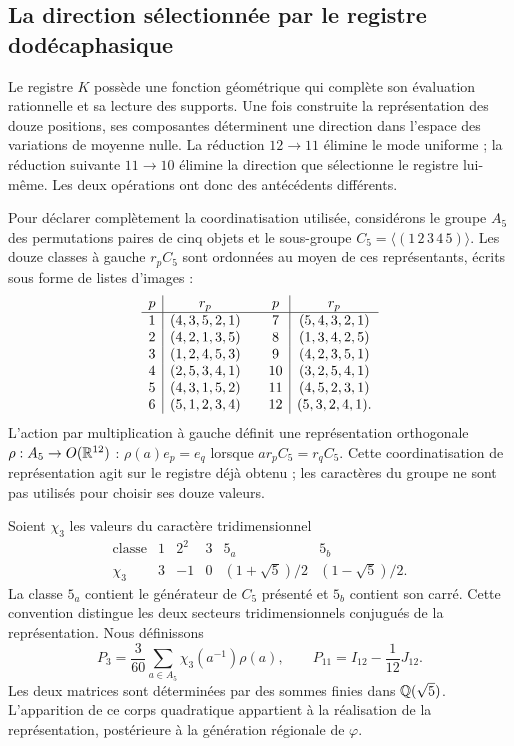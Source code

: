 \subsection{La direction sélectionnée par le registre dodécaphasique}
\label{exc:k-direccion}

Le registre \(K\) possède une fonction géométrique qui complète son évaluation rationnelle et sa lecture des supports. Une fois construite la représentation des douze positions, ses composantes déterminent une direction dans l'espace des variations de moyenne nulle. La réduction \(12\to11\) élimine le mode uniforme ; la réduction suivante \(11\to10\) élimine la direction que sélectionne le registre lui-même. Les deux opérations ont donc des antécédents différents.

Pour déclarer complètement la coordinatisation utilisée, considérons le groupe
\(A_5\) des permutations paires de cinq objets et le sous-groupe
\(C_5=\langle(1\,2\,3\,4\,5)\rangle\). Les douze classes à gauche
\(r_pC_5\) sont ordonnées au moyen de ces représentants, écrits sous forme de
listes d'images :
\[
\begin{array}{c|c@{\qquad}c|c}
p&r_p&p&r_p\\ \hline
1&(4,3,5,2,1)&7&(5,4,3,2,1)\\
2&(4,2,1,3,5)&8&(1,3,4,2,5)\\
3&(1,2,4,5,3)&9&(4,2,3,5,1)\\
4&(2,5,3,4,1)&10&(3,2,5,4,1)\\
5&(4,3,1,5,2)&11&(4,5,2,3,1)\\
6&(5,1,2,3,4)&12&(5,3,2,4,1).
\end{array}
\]
L'action par multiplication à gauche définit une représentation
orthogonale \(\rho:A_5\to O(\mathbb R^{12})\) :
\(\rho(a)e_p=e_q\) lorsque \(ar_pC_5=r_qC_5\).
Cette coordinatisation de représentation agit sur le registre déjà obtenu ;
les caractères du groupe ne sont pas utilisés pour choisir ses douze valeurs.

Soient \(\chi_3\) les valeurs du caractère tridimensionnel
\[
\begin{array}{c|ccccc}
\text{classe}&1&2^2&3&5_a&5_b\\ \hline
\chi_3&3&-1&0&(1+\sqrt5)/2&(1-\sqrt5)/2.
\end{array}
\]
La classe \(5_a\) contient le générateur de \(C_5\) présenté et \(5_b\) contient son carré. Cette convention distingue les deux secteurs tridimensionnels conjugués de la représentation. Nous définissons
\begin{equation}
 P_3=\frac3{60}\sum_{a\in A_5}\chi_3(a^{-1})\rho(a),
 \qquad P_{11}=I_{12}-\frac1{12}J_{12}.
 \label{eq:k-proyectores-incidencia}
\end{equation}
Les deux matrices sont déterminées par des sommes finies dans
\(\mathbb Q(\sqrt5)\). L'apparition de ce corps quadratique appartient
à la réalisation de la représentation, postérieure à la génération
régionale de \(\varphi\).

